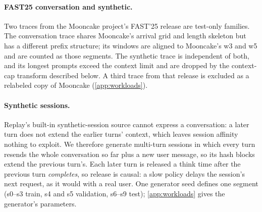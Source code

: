 \paragraph{FAST25 conversation and synthetic.}
Two traces from the Mooncake project's FAST'25 release \citep{mooncake} are test-only families.
The conversation trace shares Mooncake's arrival grid and length skeleton but has a different
prefix structure; its windows are aligned to Mooncake's w3 and w5 and are counted as those
segments. The synthetic trace is independent of both, and its longest prompts exceed the context
limit and are dropped by the context-cap transform described below. A third trace from that release
is excluded as a relabeled copy of Mooncake (\cref{app:workloads}).

\paragraph{Synthetic sessions.}
Replay's built-in synthetic-session source cannot express a conversation: a later turn does not
extend the earlier turns' context, which leaves session affinity nothing to exploit. We therefore
generate multi-turn sessions in which every turn resends the whole conversation so far plus a new
user message, so its hash blocks extend the previous turn's. Each later turn is released a think
time after the previous turn \emph{completes}, so release is causal: a slow policy delays the
session's next request, as it would with a real user. One generator seed defines one segment
(s0--s3 train, s4 and s5 validation, s6--s9 test); \cref{app:workloads} gives the generator's
parameters.

